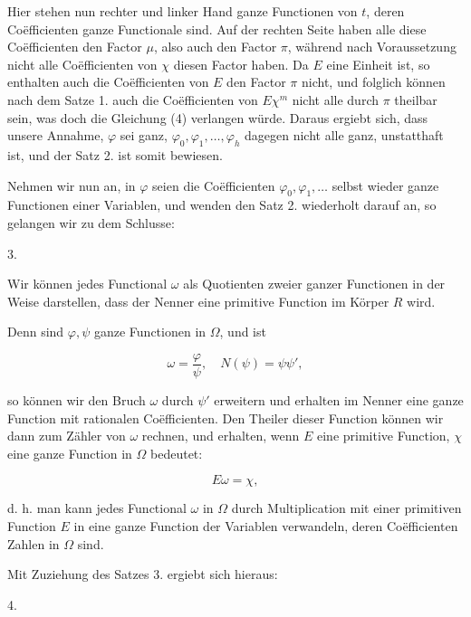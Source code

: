 
Hier stehen nun rechter und linker Hand ganze Functionen von $t$, deren Co\"efficienten ganze Functionale sind. Auf der rechten Seite haben alle diese Co\"efficienten den Factor $\mu$, also auch den Factor $\pi$, w\"ahrend nach Voraussetzung nicht alle Co\"efficienten von $\chi$ diesen Factor haben. Da $E$ eine Einheit ist, so enthalten auch die Co\"efficienten von $E$ den Factor $\pi$ nicht, und folglich k\"onnen nach dem Satze 1. auch die Co\"efficienten von $E\chi^m$ nicht alle durch $\pi$ theilbar sein, was doch die Gleichung (4) verlangen w\"urde. Daraus ergiebt sich, dass unsere Annahme, $\varphi$ sei ganz, $\varphi_0, \varphi_1, \ldots, \varphi_h$ dagegen nicht alle ganz, unstatthaft ist, und der Satz 2. ist somit bewiesen.

Nehmen wir nun an, in $\varphi$ seien die Co\"efficienten $\varphi_0, \varphi_1, \ldots$ selbst wieder ganze Functionen einer Variablen, und wenden den Satz 2. wiederholt darauf an, so gelangen wir zu dem Schlusse:

3. 

Wir k\"onnen jedes Functional $\omega$ als Quotienten zweier ganzer Functionen in der Weise darstellen, dass der Nenner eine primitive Function im K\"orper $R$ wird.

Denn sind $\varphi, \psi$ ganze Functionen in $\Omega$, und ist

\[
\omega = \frac{\varphi}{\psi}, \quad N(\psi) = \psi\psi',
\]

so k\"onnen wir den Bruch $\omega$ durch $\psi'$ erweitern und erhalten im Nenner eine ganze Function mit rationalen Co\"efficienten. Den Theiler dieser Function k\"onnen wir dann zum Z\"ahler von $\omega$ rechnen, und erhalten, wenn $E$ eine primitive Function, $\chi$ eine ganze Function in $\Omega$ bedeutet:

\[
E\omega = \chi,
\]

d. h. man kann jedes Functional $\omega$ in $\Omega$ durch Multiplication mit einer primitiven Function $E$ in eine ganze Function der Variablen verwandeln, deren Co\"efficienten Zahlen in $\Omega$ sind.

Mit Zuziehung des Satzes 3. ergiebt sich hieraus:

4. 
